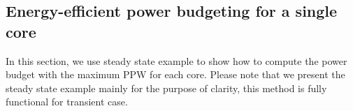 

\subsection{Energy-efficient power budgeting for a single core}
In this section, we use steady state example to show how to compute
the power budget with the maximum PPW for each core. Please note that
we present the steady state example mainly for the purpose of clarity,
this method is fully functional for transient case. 



